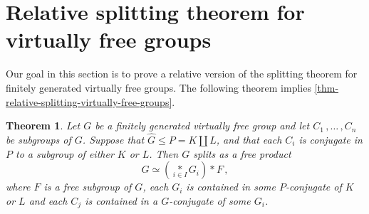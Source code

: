 \documentclass[a4paper]{amsart}
\newtheorem{teo}[lem]{Theorem}
\theoremstyle{definition}
\theoremstyle{remark}
\begin{document}
\section{Relative splitting theorem for virtually free groups}\label{sect:relative}

Our goal in this section is to prove a relative version of the splitting theorem for finitely generated virtually free groups. The following theorem implies \cref{thm-relative-splitting-virtually-free-groups}.

\begin{teo}\label{relative splitting} Let \(G\) be a finitely generated virtually free group and let \(C_1\,,\ldots\,,C_n\) be subgroups of \(G\). Suppose that \(\widehat{G} \leq P = K\amalg L\), and that each \(C_i\) is conjugate in \(P\) to a subgroup of either \(K\) or \(L\). Then \(G\) splits as a free product \[G \simeq \left(\underset{i \in I}{\ast} G_i\right)  *F\,,\] where \(F\) is a free subgroup of \(G\), each \(G_i\) is contained in some \(P\)-conjugate of \(K\) or \(L\) and each \(C_j\) is contained in a \(G\)-conjugate of some \(G_i\).
\end{teo}
\end{document}
